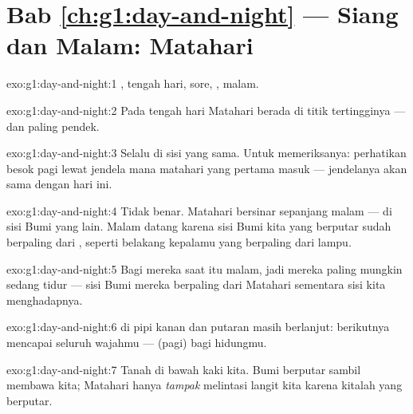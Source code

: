 \section*{Bab \ref{ch:g1:day-and-night} --- Siang dan Malam: Matahari}

\begin{solution}{exo:g1:day-and-night:1}
, tengah hari, sore, , malam.
\end{solution}

\begin{solution}{exo:g1:day-and-night:2}
Pada tengah hari Matahari berada di titik tertingginya --- dan
 paling pendek.
\end{solution}

\begin{solution}{exo:g1:day-and-night:3}
Selalu di sisi yang sama. Untuk memeriksanya: perhatikan besok pagi
lewat jendela mana  matahari yang pertama masuk --- jendelanya
akan sama dengan hari ini.
\end{solution}

\begin{solution}{exo:g1:day-and-night:4}
Tidak benar. Matahari bersinar sepanjang malam --- di sisi Bumi yang
lain. Malam datang karena sisi Bumi kita yang berputar sudah berpaling
dari , seperti belakang kepalamu yang berpaling dari lampu.
\end{solution}

\begin{solution}{exo:g1:day-and-night:5}
Bagi mereka saat itu malam, jadi mereka paling mungkin sedang tidur
--- sisi Bumi mereka berpaling dari Matahari sementara sisi kita
menghadapnya.
\end{solution}

\begin{solution}{exo:g1:day-and-night:6}
 di pipi kanan dan putaran masih berlanjut: berikutnya 
mencapai seluruh wajahmu ---  (pagi) bagi hidungmu.
\end{solution}

\begin{solution}{exo:g1:day-and-night:7}
Tanah di bawah kaki kita. Bumi berputar sambil membawa kita; Matahari
hanya \emph{tampak} melintasi langit kita karena kitalah yang
berputar.
\end{solution}

